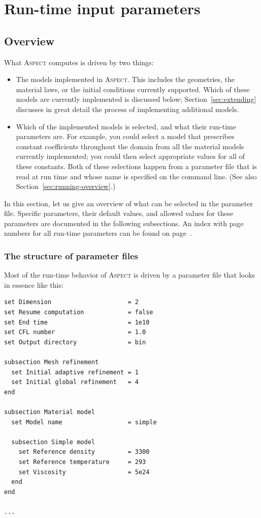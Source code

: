\documentclass{article}
\newcommand{\aspect}{\textsc{Aspect}}
\begin{document}
\section{Run-time input parameters}
\label{sec:parameters}

\subsection{Overview}
\label{sec:parameters-overview}

What \aspect{} computes is driven by two things:
\begin{itemize}
\item The models implemented in \aspect{}. This includes the geometries, the
  material laws, or the initial conditions currently supported. Which of these
  models are currently implemented is discussed below;
  Section~\ref{sec:extending} discusses in great detail the process of
  implementing additional models.

\item Which of the implemented models is selected, and what their run-time
  parameters are. For example, you could select a model that prescribes
  constant coefficients throughout the domain from all the material models
  currently implemented; you could then select appropriate values for all of
  these constants. Both of these selections happen from a parameter file that
  is read at run time and whose name is specified on the command line. (See
  also Section~\ref{sec:running-overview}.)
\end{itemize}
In this section, let us give an overview of what can be selected in the
parameter file. Specific parameters, their default values, and allowed values
for these parameters are documented in the following subsections. An index
with page numbers for all run-time parameters can be found on
page~\pageref{sec:runtime-parameter-index}.

\subsubsection{The structure of parameter files}

Most of the run-time behavior of \aspect{} is driven by a parameter file that
looks in essence like this:
\begin{lstlisting}[frame=single,language=prmfile]
set Dimension                     = 2
set Resume computation            = false
set End time                      = 1e10
set CFL number                    = 1.0
set Output directory              = bin

subsection Mesh refinement
  set Initial adaptive refinement = 1
  set Initial global refinement   = 4
end

subsection Material model
  set Model name                  = simple

  subsection Simple model
    set Reference density         = 3300
    set Reference temperature     = 293
    set Viscosity                 = 5e24
  end
end

...
\end{lstlisting}
\end{document}
